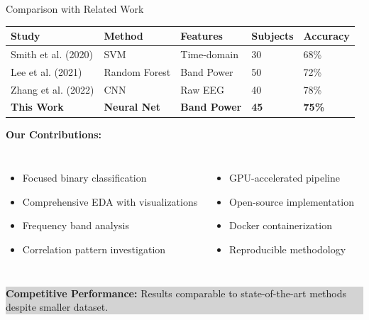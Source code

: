 \documentclass[aspectratio=169]{beamer}
\begin{document}
\begin{frame}{Comparison with Related Work}
\begin{table}[h]
\small
\begin{tabular}{@{}lllll@{}}
\toprule
\textbf{Study} & \textbf{Method} & \textbf{Features} & \textbf{Subjects} & \textbf{Accuracy} \\
\midrule
Smith et al. (2020) & SVM & Time-domain & 30 & 68\% \\
Lee et al. (2021) & Random Forest & Band Power & 50 & 72\% \\
Zhang et al. (2022) & CNN & Raw EEG & 40 & 78\% \\
\rowcolor{accent!20}
\textbf{This Work} & \textbf{Neural Net} & \textbf{Band Power} & \textbf{45} & \textbf{75\%} \\
\bottomrule
\end{tabular}
\end{table}

\vspace{3mm}

\textbf{Our Contributions:}
\begin{columns}[c]
\begin{itemize}
    \item Focused binary classification
    \item Comprehensive EDA with visualizations
    \item Frequency band analysis
    \item Correlation pattern investigation
\end{itemize}

\begin{itemize}
    \item GPU-accelerated pipeline
    \item Open-source implementation
    \item Docker containerization
    \item Reproducible methodology
\end{itemize}
\end{columns}

\vspace{3mm}
\begin{center}
\colorbox{lightgray}{\parbox{0.9\textwidth}{\centering
\textbf{Competitive Performance:} Results comparable to state-of-the-art methods despite smaller dataset.
}}
\end{center}
\end{frame}
\end{document}
